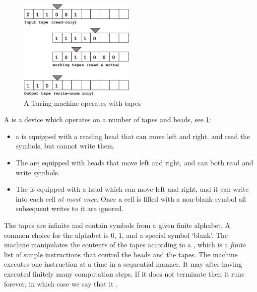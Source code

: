 \begin{figure}[htbp]
  \centering
  \includegraphics[width=0.5\textwidth]{turing_machine}
  \caption{A Turing machine operates with tapes}
  \label{fig:turing-machine}
\end{figure}

A  is a device which operates on a number of tapes and
heads, see \cref{fig:turing-machine}:
%
\begin{itemize}
\item a  is equipped with a reading head that can move left and right, and read the symbols, but cannot write them.
\item The  are equipped with heads that move left and right, and can both read and write symbols.
\item The  is equipped with a head which can
  move left and right, and it can write into each cell \emph{at most once}.
  Once a cell is filled with a non-blank symbol all subsequent writes
  to it are ignored.
\end{itemize}
%
The tapes are infinite and contain
symbols from a given finite alphabet. A common choice for the alphabet
is $0$, $1$, and a special symbol `blank'. The machine manipulates the
contents of the tapes according to a , which is a \emph{finite}
list of simple instructions that control the heads and the tapes. The
machine executes one instruction at a time in a sequential manner. It
may  after having executed finitely many computation
steps. If it does not terminate then it runs forever, in which case we
say that it .

